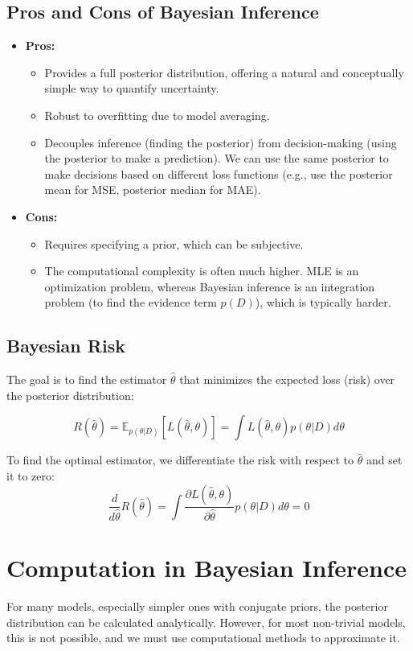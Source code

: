 \documentclass{article}
\begin{document}
\begin{multicols}{2}
	\subsection{Pros and Cons of Bayesian Inference}
	\begin{itemize}
		\item \textbf{Pros:}
		      \begin{itemize}
			      \item Provides a full posterior distribution, offering a natural and conceptually simple way to quantify uncertainty.
			      \item Robust to overfitting due to model averaging.
			      \item Decouples inference (finding the posterior) from decision-making (using the posterior to make a prediction). We can use the same posterior to make decisions based on different loss functions (e.g., use the posterior mean for MSE, posterior median for MAE).
		      \end{itemize}
		\item \textbf{Cons:}
		      \begin{itemize}
			      \item Requires specifying a prior, which can be subjective.
			      \item The computational complexity is often much higher. MLE is an optimization problem, whereas Bayesian inference is an integration problem (to find the evidence term $p(D)$), which is typically harder.
		      \end{itemize}
	\end{itemize}

	\subsection{Bayesian Risk}
	The goal is to find the estimator $\hat{\theta}$ that minimizes the expected loss (risk) over the posterior distribution:

	$$ R(\hat{\theta}) = \mathbb{E}_{p(\theta|D)}[L(\hat{\theta}, \theta)] = \int L(\hat{\theta}, \theta) p(\theta|D) d\theta $$

	To find the optimal estimator, we differentiate the risk with respect to $\hat{\theta}$ and set it to zero:
	$$ \frac{d}{d\hat{\theta}} R(\hat{\theta}) = \int \frac{\partial L(\hat{\theta}, \theta)}{\partial \hat{\theta}} p(\theta|D) d\theta = 0 $$

	\section{Computation in Bayesian Inference}
	For many models, especially simpler ones with conjugate priors, the posterior distribution can be calculated analytically. However, for most non-trivial models, this is not possible, and we must use computational methods to approximate it.


\end{multicols}
\end{document}
